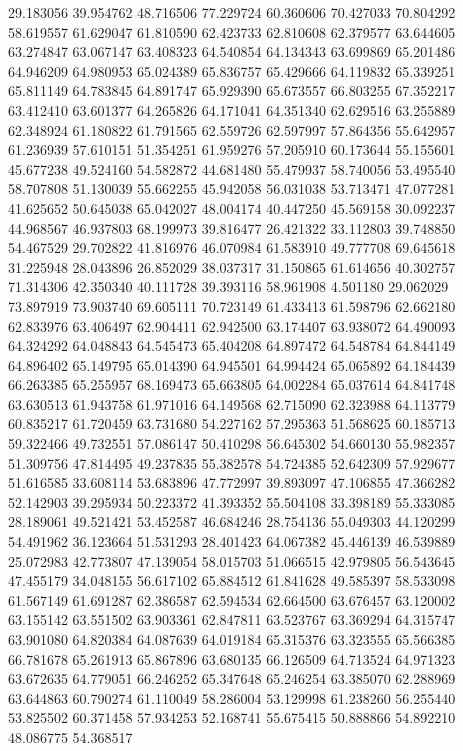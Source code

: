 29.183056
39.954762
48.716506
77.229724
60.360606
70.427033
70.804292
58.619557
61.629047
61.810590
62.423733
62.810608
62.379577
63.644605
63.274847
63.067147
63.408323
64.540854
64.134343
63.699869
65.201486
64.946209
64.980953
65.024389
65.836757
65.429666
64.119832
65.339251
65.811149
64.783845
64.891747
65.929390
65.673557
66.803255
67.352217
63.412410
63.601377
64.265826
64.171041
64.351340
62.629516
63.255889
62.348924
61.180822
61.791565
62.559726
62.597997
57.864356
55.642957
61.236939
57.610151
51.354251
61.959276
57.205910
60.173644
55.155601
45.677238
49.524160
54.582872
44.681480
55.479937
58.740056
53.495540
58.707808
51.130039
55.662255
45.942058
56.031038
53.713471
47.077281
41.625652
50.645038
65.042027
48.004174
40.447250
45.569158
30.092237
44.968567
46.937803
68.199973
39.816477
26.421322
33.112803
39.748850
54.467529
29.702822
41.816976
46.070984
61.583910
49.777708
69.645618
31.225948
28.043896
26.852029
38.037317
31.150865
61.614656
40.302757
71.314306
42.350340
40.111728
39.393116
58.961908
4.501180
29.062029
73.897919
73.903740
69.605111
70.723149
61.433413
61.598796
62.662180
62.833976
63.406497
62.904411
62.942500
63.174407
63.938072
64.490093
64.324292
64.048843
64.545473
65.404208
64.897472
64.548784
64.844149
64.896402
65.149795
65.014390
64.945501
64.994424
65.065892
64.184439
66.263385
65.255957
68.169473
65.663805
64.002284
65.037614
64.841748
63.630513
61.943758
61.971016
64.149568
62.715090
62.323988
64.113779
60.835217
61.720459
63.731680
54.227162
57.295363
51.568625
60.185713
59.322466
49.732551
57.086147
50.410298
56.645302
54.660130
55.982357
51.309756
47.814495
49.237835
55.382578
54.724385
52.642309
57.929677
51.616585
33.608114
53.683896
47.772997
39.893097
47.106855
47.366282
52.142903
39.295934
50.223372
41.393352
55.504108
33.398189
55.333085
28.189061
49.521421
53.452587
46.684246
28.754136
55.049303
44.120299
54.491962
36.123664
51.531293
28.401423
64.067382
45.446139
46.539889
25.072983
42.773807
47.139054
58.015703
51.066515
42.979805
56.543645
47.455179
34.048155
56.617102
65.884512
61.841628
49.585397
58.533098
61.567149
61.691287
62.386587
62.594534
62.664500
63.676457
63.120002
63.155142
63.551502
63.903361
62.847811
63.523767
63.369294
64.315747
63.901080
64.820384
64.087639
64.019184
65.315376
63.323555
65.566385
66.781678
65.261913
65.867896
63.680135
66.126509
64.713524
64.971323
63.672635
64.779051
66.246252
65.347648
65.246254
63.385070
62.288969
63.644863
60.790274
61.110049
58.286004
53.129998
61.238260
56.255440
53.825502
60.371458
57.934253
52.168741
55.675415
50.888866
54.892210
48.086775
54.368517
